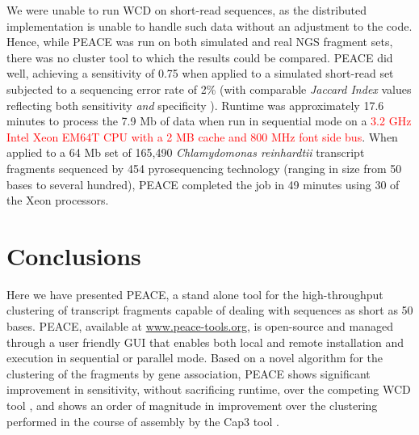 \documentclass[a4,center,fleqn]{NAR}
\newcommand{\mc}[1]{\textcolor{red}{#1}}
\newcommand{\peace} {{\small PEACE}}
\newcommand{\wcd} {{\small WCD}}
\newcommand{\capthree} {{\small Cap3}}
\begin{document}

We were unable to run \wcd\/ on short-read sequences, as the
distributed implementation is unable to handle such data without an
adjustment to the code.  Hence, while \peace\/ was run on both
simulated and real NGS fragment sets, there was no cluster tool to
which the results could be compared.  \peace\/ did well, achieving a
sensitivity of 0.75 when applied to a simulated short-read set
subjected to a sequencing error rate of 2\% (with comparable {\it
  Jaccard Index} values reflecting both sensitivity {\it and}
specificity \cite{Kalyanaraman03,Hazelhurst08a}).  Runtime was
approximately 17.6 minutes to process the 7.9 Mb of data when run in
sequential mode on a \mc{3.2 GHz Intel Xeon EM64T CPU with a 2 MB
  cache and 800 MHz font side bus}.  When applied to a 64 Mb set of
165,490 {\it
 Chlamydomonas reinhardtii} transcript fragments
sequenced by 454 pyrosequencing technology (ranging in size from 50
bases to several hundred), \peace\/ completed the job in 49 minutes
using 30 of the Xeon processors.

\section{Conclusions}

Here we have presented \peace, a stand alone tool for the
high-throughput clustering of transcript fragments capable of dealing
with sequences as short as 50 bases.  \peace\/, available at
\href{http://www.peace-tools.org}{www.peace-tools.org}, is open-source
and managed through a user friendly GUI that enables both local and
remote installation and execution in sequential or parallel mode.
Based on a novel algorithm for the clustering of the fragments by gene
association, \peace\/ shows significant improvement in sensitivity,
without sacrificing runtime, over the competing \wcd\/ tool
\cite{Hazelhurst08a}, and shows an order of magnitude in improvement
over the clustering performed in the course of assembly by the
\capthree\/ tool \cite{Huang99}.
\end{document}
